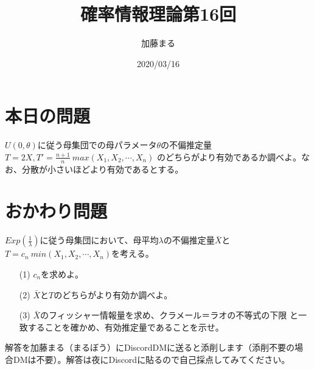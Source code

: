 \documentclass[a4j,uplatex,dvipdfmx]{jsarticle}
\title{確率情報理論第16回}
\author{加藤まる}
\date{2020/03/16}
\begin{document}
\maketitle

\section*{本日の問題}
$U(0,\theta)$に従う母集団での母パラメータ$\theta$の不偏推定量$T=2X,T'=\frac{n+1}{n}~max(X_1,X_2,\cdots,X_n)$
のどちらがより有効であるか調べよ。なお、分散が小さいほどより有効であるとする。


\section*{おかわり問題}
$Exp(\frac{1}{\lambda})$に従う母集団において、母平均$\lambda$の不偏推定量$\bar{X}$と
$T=c_n~min(X_1,X_2,\cdots,X_n)$を考える。
\begin{itemize}
  \item[(1)]$c_n$を求めよ。
  \item[(2)]$\bar{X}$と$T$のどちらがより有効か調べよ。
  \item[(3)]$\bar{X}$のフィッシャー情報量を求め、クラメール＝ラオの不等式の下限
  と一致することを確かめ、有効推定量であることを示せ。
\end{itemize}



解答を加藤まる（まるぼう）にDiscordDMに送ると添削します（添削不要の場合DMは不要）。解答は夜にDiscordに貼るので自己採点してみてください。
\end{document}
